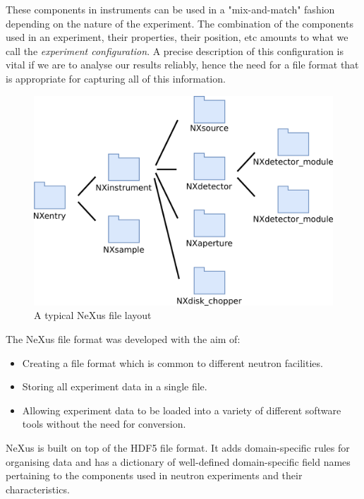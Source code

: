 These components in instruments can be used in a "mix-and-match" fashion depending on the nature of the experiment. The combination of the components used in an experiment, their properties, their position, etc amounts to what we call the \textit{experiment configuration}. A precise description of this configuration is vital if we are to analyse our results reliably, hence the need for a file format that is appropriate for capturing all of this information. 

\begin{figure}
\begin{center}
\includegraphics[width=0.8\linewidth]{instrument_arch.png}
\end{center}
\caption{A typical NeXus file layout}
\vspace{-50pt}
\end{figure}


The NeXus file format was developed with the aim of:
\begin{itemize}
\item Creating a file format which is common to different neutron facilities.
\item Storing all experiment data in a single file.
\item Allowing experiment data to be loaded into a variety of different software tools without the need for conversion.
\end{itemize}

\smallskip

NeXus is built on top of the HDF5 file format. It adds domain-specific rules for organising data and has a dictionary of well-defined domain-specific field names pertaining to the components used in neutron experiments and their characteristics.
